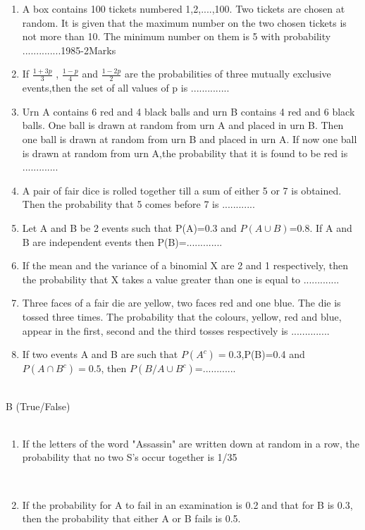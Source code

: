 \documentclass[journal,12pt,twocolumn]{IEEEtran}
\theoremstyle{remark}
\begin{document}
\begin{enumerate}
    \hfill{}\\
    \item A box contains 100 tickets numbered 1,2,....,100. Two tickets are chosen at random. It is given that the maximum number on the two chosen tickets is not more than 10. The minimum number on them is 5 with probability ..............\hfill{1985-2Marks}\\
    \item If $\frac{1+3p}{3}$ , $\frac{1-p}{4}$ and $\frac{1-2p}{2}$ are the probabilities of three mutually exclusive events,then the set of all values of p is ..............\hfill{}\\
    \item Urn A contains 6 red and 4 black balls and urn B contains 4 red and 6 black balls. One ball is drawn at random from urn A and placed in urn B. Then one ball is drawn at random from urn B and placed in urn A. If now one ball is drawn at random from urn A,the probability that it is found to be red is .............\hfill{}\\
    \item A pair of fair dice is rolled together till a sum of either 5 or 7 is obtained. Then the probability that 5 comes before 7 is 
    ............
    \hfill{}\\
    \item Let A and B be 2 events such that P(A)=0.3 and $P(A \cup B)$=0.8. If A and B are independent events then P(B)=.............\hfill{}\\
    \item If the mean and the variance of a binomial X are 2 and 1 respectively, then the probability that X takes a value greater than one is equal to .............\hfill{}\\ 
    \item Three faces of a fair die are yellow, two faces red and one blue. The die is tossed three times. The probability that the colours, yellow, red and blue, appear in the first, second and the third tosses  respectively is ..............\hfill{}\\
    \item If two events A and B are such that $P(A^{c})=0.3$,P(B)=0.4 and $P(A \cap B^{c})=0.5$, then $P(B/A \cup B^{c})$=............ \hfill{}\\\\
\end{enumerate}
B (True/False)\\\\
\begin{enumerate}
    \item If the letters of the word "Assassin" are written down at random in a row, the probability that no two S's occur together is 1/35
    
    \hfill{}\\
    \item If the probability for A to fail in an examination is 0.2 and that for B is 0.3, then the probability that either A or B fails is 0.5.
    
    \hfill{}
\end{enumerate}
\end{document}
